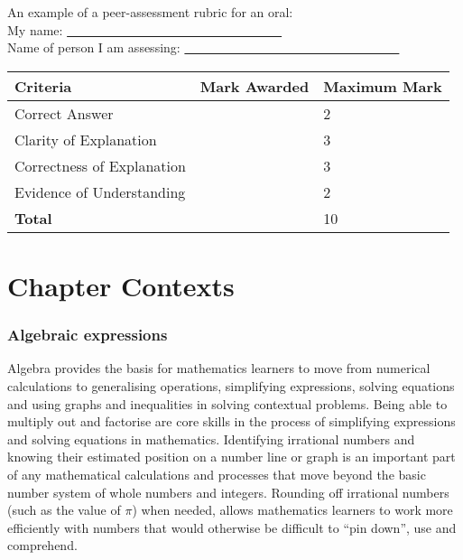 An example of a peer-assessment rubric for an oral: \\
My name: \underline{~~~~~~~~~~~~~~~~~~~~~~~~~~~~~~~~~~}\\
Name of person I am assessing: \underline{~~~~~~~~~~~~~~~~~~~~~~~~~~~~~~~~~~}\\

\begin{table}[H]
 \begin{center}
  \begin{tabular}{|p{5cm}|p{2.5cm}|p{2.5cm}|} \hline
  \textbf{Criteria} & \textbf{Mark Awarded} & \textbf{Maximum Mark}\\ \hline
Correct Answer &&2\\ \hline
Clarity of Explanation&&3\\ \hline
Correctness of Explanation  &&3\\ \hline
Evidence of Understanding &&2\\ \hline
\textbf{Total} &&10\\ \hline

  \end{tabular}

 \end{center}

\end{table}

\section{Chapter Contexts}
\subsubsection{Algebraic expressions}
Algebra provides the basis for mathematics learners to move from numerical calculations to generalising operations, simplifying expressions, solving equations and using graphs and inequalities in solving contextual problems. Being able to multiply out and factorise are core skills in the process of simplifying expressions and solving equations in mathematics. Identifying irrational numbers and knowing their estimated position on a number line or graph is an important part of any mathematical calculations and processes that move beyond the basic number system of whole numbers and integers. Rounding off irrational numbers (such as the value of $\pi$) when needed, allows mathematics learners to work more efficiently with numbers that would otherwise be difficult to “pin down”, use and comprehend.  \par

